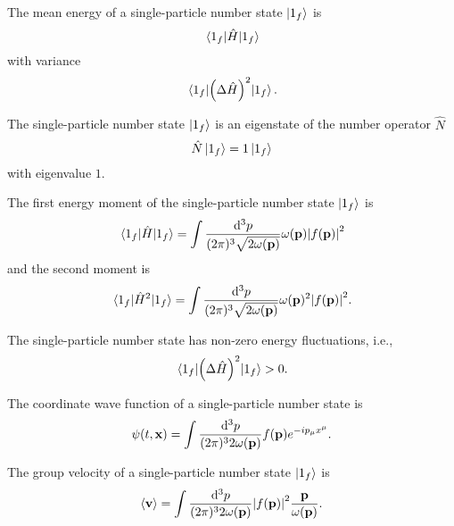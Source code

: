 \begin{theorem}\label{thm:single_particle_number_state_energy}
	The mean energy of a single-particle number state $\ket{1_f}$ is
	\begin{equation}
		\expval{\hat{H}}{1_f}
	\end{equation}
	with variance
	\begin{equation}
		\expval{\left(\Delta\hat{H}\right)^2}{1_f}
		.
	\end{equation}
\end{theorem}
\begin{theorem}\label{thm:single_particle_number_state_number_eigenstate}
	The single-particle number state $\ket{1_f}$ is an eigenstate of the number operator $\hat{N}$
	\begin{equation}
		\hat{N}
		\ket{1_f}
		=
		1
		\ket{1_f}
	\end{equation}
	with eigenvalue $1$.
\end{theorem}
\begin{lemma}\label{thm:single_particle_number_state_energy}
	The first energy moment of the single-particle number state $\ket{1_f}$ is
	\begin{equation}
		\expval{\hat{H}}{1_f}
		=
		\int\frac{\dd[3]{p}}{(2\pi)^3\sqrt{2\omega(\vb{p})}}
		\omega(\vb{p})
		\abs{f(\vb{p})}^2
	\end{equation}
	and the second moment is
	\begin{equation}
		\expval{\hat{H}^2}{1_f}
		=
		\int\frac{\dd[3]{p}}{(2\pi)^3\sqrt{2\omega(\vb{p})}}
		\omega(\vb{p})^2
		\abs{f(\vb{p})}^2
		.
	\end{equation}
\end{lemma}
\begin{corollary}
	The single-particle number state has non-zero energy fluctuations, i.e.,
	\begin{equation}
		\expval{\left(\Delta\hat{H}\right)^2}{1_f}
		>
		0
		.
	\end{equation}
\end{corollary}
\begin{lemma}\label{thm:single_particle_number_state_wave_function}
	The coordinate wave function of a single-particle number state is
	\begin{equation}
		\psi(t,\vb{x})
		=
		\int\frac{\dd[3]{p}}{(2\pi)^32\omega(\vb{p})}
		f(\vb{p})e^{-ip_\mu x^\mu}
		.
	\end{equation}
\end{lemma}
\begin{lemma}\label{thm:single_particle_number_state_group_velocity}
	The group velocity of a single-particle number state $\ket{1_f}$ is
	\begin{equation}
		\expval{\vb{v}}
		=
		\int\frac{\dd[3]{p}}{(2\pi)^32\omega(\vb{p})}
		\abs{f(\vb{p})}^2
		\frac{\vb{p}}{\omega(\vb{p})}
		\label{eq:single_particle_number_state_group_velocity}
		.
	\end{equation}
\end{lemma}
